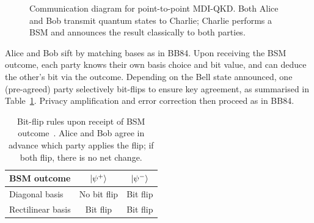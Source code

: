 \documentclass[12pt]{article}
\begin{document}
\begin{figure}[H]
    \centering
    \caption{Communication diagram for point-to-point MDI-QKD. Both Alice and Bob transmit quantum states to Charlie; Charlie performs a BSM and announces the result classically to both parties.}
    \label{fig:mdi_comm}
\end{figure}

Alice and Bob sift by matching bases as in BB84. Upon receiving the BSM outcome, each party knows their own basis choice and bit value, and can deduce the other's bit via the outcome. Depending on the Bell state announced, one (pre-agreed) party selectively bit-flips to ensure key agreement, as summarised in Table~\ref{tab:mdi_flips}. Privacy amplification and error correction then proceed as in BB84.

\begin{table}[H]
    \centering
    \begin{tabular}{lcc}
        \toprule
        BSM outcome & $\ket{\psi^{+}}$ & $\ket{\psi^{-}}$ \\
        \midrule
        Diagonal basis    & No bit flip & Bit flip \\
        Rectilinear basis & Bit flip    & Bit flip \\
        \bottomrule
    \end{tabular}
    \caption{Bit-flip rules upon receipt of BSM outcome~\cite{Lo_2012}. Alice and Bob agree in advance which party applies the flip; if both flip, there is no net change.}
    \label{tab:mdi_flips}
\end{table}
\end{document}
